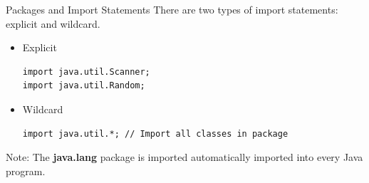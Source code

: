 \documentclass[11pt]{beamer}
\begin{document}
\begin{frame}[fragile]{Packages and Import Statements}
    There are two types of import statements: explicit and wildcard.
    \begin{itemize}
        \item Explicit
        \begin{lstlisting}
import java.util.Scanner;
import java.util.Random;            
        \end{lstlisting}
        \item Wildcard
        \begin{lstlisting}
import java.util.*; // Import all classes in package            
        \end{lstlisting}
    \end{itemize}
Note: The \textbf{java.lang} package is imported automatically imported into every Java program.
\end{frame}




\end{document}
